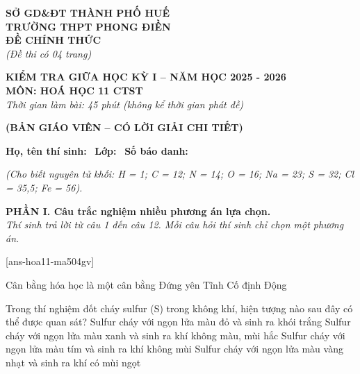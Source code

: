 \documentclass[12pt,a4paper]{article}
\begin{document}
\thispagestyle{firstpage}

\noindent
\begin{minipage}[t]{0.45\textwidth}
	\centering\fontsize{10pt}{12pt}\selectfont
	\textbf{SỞ GD\&ĐT THÀNH PHỐ HUẾ}\\
	\textbf{TRƯỜNG THPT PHONG ĐIỀN}\\
	\textbf{ĐỀ CHÍNH THỨC}\\
	\textit{(Đề thi có 04 trang)}
\end{minipage}\hfill
\begin{minipage}[t]{0.53\textwidth}
	\centering\small
	\textbf{KIỂM TRA GIỮA HỌC KỲ I -- NĂM HỌC 2025 - 2026}\\
	\textbf{MÔN: HOÁ HỌC 11 CTST}\\
	\textit{Thời gian làm bài: 45 phút (không kể thời gian phát đề)}\\
\end{minipage}

\smallskip
\begin{center}
	{\color{hfRed}\textbf{\large (BẢN GIÁO VIÊN -- CÓ LỜI GIẢI CHI TIẾT)}}
\end{center}

\smallskip
\noindent\hrulefill
\smallskip

\noindent\textbf{Họ, tên thí sinh:} \dotfill\ \textbf{Lớp:} \dotfill\ \textbf{Số báo danh:} \dotfill

\smallskip
\noindent\textit{(Cho biết nguyên tử khối: H = 1; C = 12; N = 14; O = 16; Na = 23; S = 32; Cl = 35,5; Fe = 56).}
\smallskip

\noindent
\textbf{PHẦN I. Câu trắc nghiệm nhiều phương án lựa chọn.}\\
\textit{Thí sinh trả lời từ câu 1 đến câu 12. Mỗi câu hỏi thí sinh chỉ chọn một phương án.}

[ans-hoa11-ma504gv]

\begin{ex}
Cân bằng hóa học là một cân bằng
\choice
{Đứng yên}
{Tĩnh}
{Cố định}
{\True Động}
\end{ex}

\begin{ex}
Trong thí nghiệm đốt cháy sulfur (S) trong không khí, hiện tượng nào sau đây có thể được quan sát?
\choice
{Sulfur cháy với ngọn lửa màu đỏ và sinh ra khói trắng}
{\True Sulfur cháy với ngọn lửa màu xanh và sinh ra khí không màu, mùi hắc}
{Sulfur cháy với ngọn lửa màu tím và sinh ra khí không mùi}
{Sulfur cháy với ngọn lửa màu vàng nhạt và sinh ra khí có mùi ngọt}
\end{ex}
\end{document}
